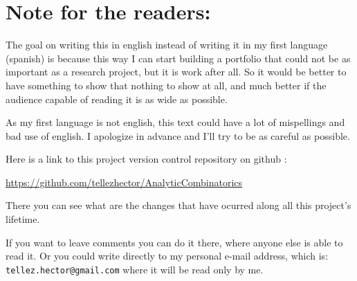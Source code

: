 \chapter*{Note for the readers:}
    The goal on writing this in english instead of writing it in my first language (spanish) is because 
    this way I can start building a portfolio that could not be as important as a research project, but
    it is work after all. So it would be better to have something to show that nothing to show at all, 
    and much better if the audience capable of reading it is as wide as possible.\pn
    
    As my first language is not english, this text could have a lot of mispellings and
    bad use of english. I apologize in advance and I'll try to be as careful as possible.\pn
    
    Here is a link to this project version control repository on github	:\par
    \href{https://github.com/tellezhector/AnalyticCombinatorics}{https://github.com/tellezhector/AnalyticCombinatorics}\par
    There you can see what are the changes that have ocurred along all this project's lifetime.\pn
    
    If you want to leave comments you can do it there, where anyone else is able to read it. Or you could 
    write directly to my personal e-mail address, which is: \texttt{tellez.hector@gmail.com} where it will be read only
    by me.